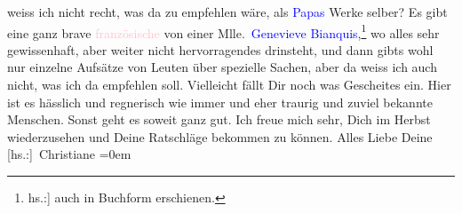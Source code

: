                     weiss ich nicht recht, was da zu empfehlen wäre, als \textcolor{blue}{Papas}{} Werke selber? Es gibt eine ganz
                    brave \textcolor{pink}{französische}{}\ledrightnote{\textcolor{pink}{Frankreich}}{ }\label{K_L02519_2v}\label{K_L02519_2h} von einer Mlle. \textcolor{blue}{Genevieve
                        Bianquis}{}\ledrightnote{\textcolor{blue}{Geneviève Bianquis}},\footnote{\noindent{}{[}hs.:{]} auch in Buchform erschienen.} wo alles sehr gewissenhaft, aber weiter nicht hervorragend\introOben{}es\introOben{} drinsteht, und dann gibts wohl nur einzelne Aufsätze
                    von Leuten über spezielle Sachen, aber da weiss ich auch nicht, was ich da
                    empfehlen soll. Vielleicht fällt Dir noch was Gescheites ein.\pend
           \pstart
           Hier ist es hässlich und regnerisch wie immer und eher traurig und zuviel
                    bekannte Menschen.\pend
           \pstart
           Sonst geht es soweit ganz gut.\pend
           \pstart
           Ich freue mich sehr, Dich im Herbst wiederzusehen und Deine
                    Ratschläge bekommen zu können.\pend
           \pstart
           Alles Liebe Deine{\\[\baselineskip]}\spacefill\mbox{{[}hs.:{]} Christiane}\pend
           \leftskip=0em{}\endnumbering{}  
      
